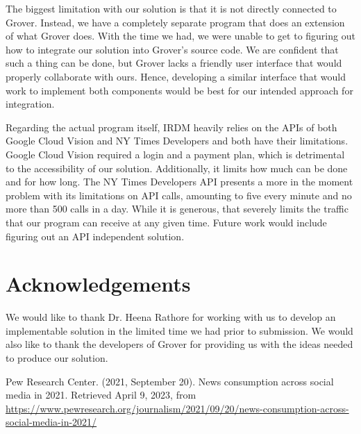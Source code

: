 \documentclass[conference]{IEEEtran}
\begin{document}
The biggest limitation with our solution is that it is not directly connected to Grover. Instead, we have a completely separate program that does an extension of what Grover does. With the time we had, we were unable to get to figuring out how to integrate our solution into Grover's source code. We are confident that such a thing can be done, but Grover lacks a friendly user interface that would properly collaborate with ours. Hence, developing a similar interface that would work to implement both components would be best for our intended approach for integration. 

Regarding the actual program itself, IRDM heavily relies on the APIs of both Google Cloud Vision and NY Times Developers and both have their limitations. Google Cloud Vision required a login and a payment plan, which is detrimental to the accessibility of our solution. Additionally, it limits how much can be done and for how long. The NY Times Developers API presents a more in the moment problem with its limitations on API calls, amounting to five every minute and no more than 500 calls in a day. While it is generous, that severely limits the traffic that our program can receive at any given time. Future work would include figuring out an API independent solution.

\section{Acknowledgements}

We would like to thank Dr. Heena Rathore for working with us to develop an implementable solution in the limited time we had prior to submission. We would also like to thank the developers of Grover for providing us with the ideas needed to produce our solution. 

\begin{thebibliography}{00}
 Pew Research Center. (2021, September 20). News consumption across social media in 2021. Retrieved April 9, 2023, from \url{https://www.pewresearch.org/journalism/2021/09/20/news-consumption-across-social-media-in-2021/}
\end{thebibliography}
\vspace{12pt}
\end{document}
